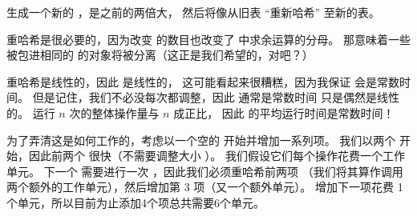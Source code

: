
 生成一个新的 ，是之前的两倍大，
然后将像从旧表 ``重新哈希'' 至新的表。


重哈希是很必要的，因为改变  的数目也改变了  中求余运算的分母。
那意味着一些被包进相同的  的对象将被分离（这正是我们希望的，对吧？）


重哈希是线性的，因此  是线性的，
这可能看起来很糟糕，因为我保证  会是常数时间。
但是记住，我们不必没每次都调整，因此  通常是常数时间
只是偶然是线性的。  运行  $n$ 次的整体操作量与 $n$ 成正比，
因此  的平均运行时间是常数时间！


为了弄清这是如何工作的，考虑以一个空的  开始并增加一系列项。
我们以两个  开始，因此前两个  很快（不需要调整大小 ）。
我们假设它们每个操作花费一个工作单元。
下一个  需要进行一次 ，因此我们必须重哈希前两项
（我们将其算作调用两个额外的工作单元），然后增加第 3 项（又一个额外单元）。
增加下一项花费 1 个单元，所以目前为止添加4个项总共需要6个单元。

